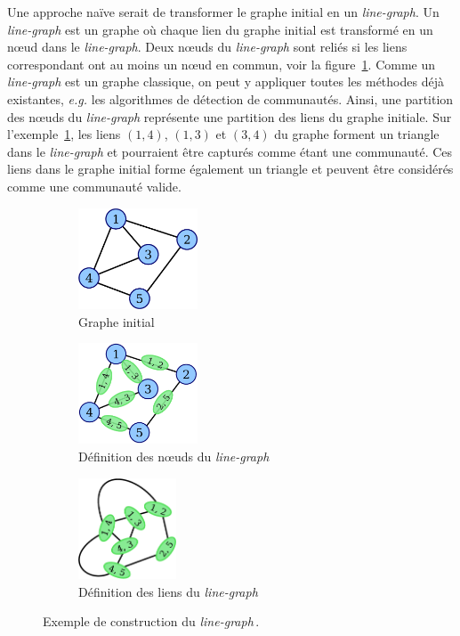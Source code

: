 Une approche naïve serait de transformer le graphe initial en un \emph{line-graph}.
Un \emph{line-graph} est un graphe où chaque lien du graphe initial est transformé en un n\oe ud dans le \emph{line-graph}.
Deux n\oe uds du \emph{line-graph} sont reliés si les liens correspondant ont au moins un n\oe ud en commun, voir la figure~\ref{fig:ex_construction_lineG}.
Comme un \emph{line-graph} est un graphe classique, on peut y appliquer toutes les méthodes déjà existantes, \emph{e.g.} les algorithmes de détection de communautés.
Ainsi, une partition des n\oe uds du \emph{line-graph} représente une partition des liens du graphe initiale.
Sur l'exemple~\ref{fig:ex_construction_lineG}, les liens $(1,4)$, $(1,3)$ et $(3, 4)$ du graphe forment un triangle dans le \emph{line-graph} et pourraient être capturés comme étant une communauté.
Ces liens dans le graphe initial forme également un triangle et peuvent être considérés comme une communauté valide.
\begin{figure}
\centering
	\begin{subfigure}{0.25\textwidth}
		\includegraphics[height=3cm]{img/ExpectedNodes/Line_graph_construction_1.eps}
		\caption{Graphe initial}
	\end{subfigure}\hspace*{0.5cm}
	\begin{subfigure}{0.25\textwidth}
		\includegraphics[height=3cm]{img/ExpectedNodes/Line_graph_construction_2.eps}
		\caption{Définition des n\oe uds du \emph{line-graph}}
	\end{subfigure}\hspace*{0.5cm}
	\begin{subfigure}{0.25\textwidth}
		\includegraphics[height=3cm]{img/ExpectedNodes/Line_graph_construction_3.eps}
		\caption{Définition des liens du \emph{line-graph}}
	\end{subfigure}	
	\caption{Exemple de construction du \emph{line-graph}\,\protect\footnotemark.}
	\label{fig:ex_construction_lineG}
\end{figure}

